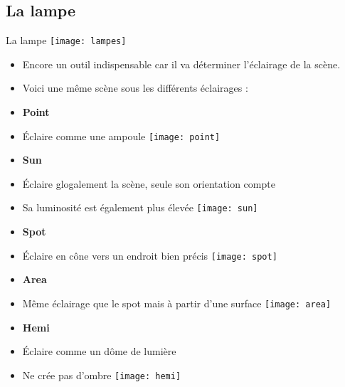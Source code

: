 \documentclass[xcolor=x11names,compress]{beamer}
\renewcommand{\(}{\begin{columns}}
\renewcommand{\)}{\end{columns}}
\newcommand{\<}[1]{\begin{column}{#1}}
\renewcommand{\>}{\end{column}}
\begin{document}
\subsection{La lampe}
\begin{frame}{La lampe}
\texttt{[image: lampes]}
    \begin{itemize}
        \item Encore un outil indispensable car il va déterminer l'éclairage de la scène.
        \vspace{0.25cm}
        \item Voici une même scène sous les différents éclairages :
    \end{itemize}
    \vspace{5cm} 
    \begin{itemize}
        \item \textbf{Point}
        \item Éclaire comme une ampoule
        \vspace{1cm}
        \texttt{[image: point]}
        \vspace{1cm}
        \item \textbf{Sun}
        \item Éclaire glogalement la scène, seule son orientation compte
        \item Sa luminosité est également plus élevée
        \texttt{[image: sun]}
        \vspace{1cm}
        \item \textbf{Spot}
        \item Éclaire en cône vers un endroit bien précis
        \texttt{[image: spot]}
        \vspace{2cm}
        \item \textbf{Area}
        \item Même éclairage que le spot mais à partir d'une surface
        \texttt{[image: area]}
        \vspace{2cm}
        \item \textbf{Hemi}
        \item Éclaire comme un dôme de lumière
        \item Ne crée pas d'ombre
        \texttt{[image: hemi]}
    \end{itemize}
\end{frame}

\end{document}
